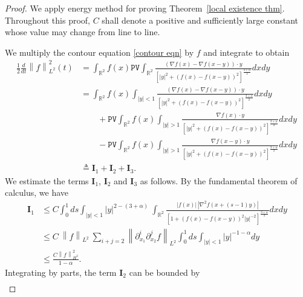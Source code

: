 \documentclass[reqno]{amsart}%
\theoremstyle{definition}
\theoremstyle{remark}
\numberwithin{equation}{section}
\newcommand{\0}{\mathbf{0}}
\newcommand{\1}{\mathbf{1}}
\newcommand{\PV}{\texttt{PV}}
\numberwithin{equation}{section}
\numberwithin{theorem}{section}
\numberwithin{figure}{section}
\begin{document}
\begin{proof}
We apply energy method for proving Theorem~\ref{local existence thm}. Throughout this proof, $C$ shall denote a positive and sufficiently large constant whose value may change from line to line.

We multiply the contour equation \eqref{contour eqn} by $f$ and integrate to obtain
\begin{equation*}
\begin{split}
\frac{1}{2} \frac{d}{dt} \left\|f\right\|_{L^2}^2(t)&=\int_{ \mathbb{R}^2 } f(x) \PV \int_{\mathbb{R}^2 } \frac{\left( \nabla f(x) - \nabla f(x - y)\right)\cdot y }{ \left[ |y|^2+(f(x)-f(x-y) )^2 \right]^{\frac{3 + \alpha}{2}} } dxdy\, \quad \quad \quad  \\
&= \int_{ \mathbb{R}^2 } f(x) \int_{ |y| < 1 } \frac{\left( \nabla f(x) - \nabla f(x - y)\right)\cdot y }{ \left[ |y|^2+(f(x)-f(x-y) )^2 \right]^{\frac{3 + \alpha}{2}} } dxdy\,   \\
&\qquad+ \PV \int_{ \mathbb{R}^2 } f(x) \int_{ |y| > 1 } \frac{ \nabla f(x)\cdot y }{ \left[ |y|^2+(f(x)-f(x-y) )^2 \right]^{\frac{3 + \alpha}{2}} } dxdy\,    \\
&\qquad- \PV \int_{ \mathbb{R}^2 } f(x) \int_{ |y| > 1 } \frac{ \nabla f(x-y)\cdot y }{ \left[ |y|^2+(f(x)-f(x-y) )^2 \right]^{\frac{3 + \alpha}{2}} } dxdy\, \\
&\triangleq \mathbf{I}_1 + \mathbf{I}_2 + \mathbf{I}_3.
\end{split}
\end{equation*}
We estimate the terms $\mathbf{I}_1$, $\mathbf{I}_2$ and $\mathbf{I}_3$ as follows. By the fundamental theorem of calculus, we have
\begin{equation*}
\begin{split}
\mathbf{I}_1&\leq C \int_{ 0 }^{1} ds  \int_{ |y| < 1 }  {|y|^{2 -(3 +\alpha)} }  \ \int_{ \mathbb{R}^2 } \frac{|f(x)| \, |\nabla^2 f(x+(s-1)y)|} {\left[ 1+\left(f(x)-f(x-y)\right)^2|y|^{-2}\right]^{\frac{3+\alpha}{2}}} dxdy\\
& \leq C \ \left\|f\right\|_{L^2} \ \sum_{i+j=2} \left\|\partial_{x_1}^i\partial_{x_2}^j f\right\|_{L^2}\int_{ 0 }^{1} ds  \int_{ |y| < 1 }  {|y|^{-1-\alpha} }dy   \\
&\leq \frac{ C\left\|f\right\|_{H^2}^2 }{ 1 - \alpha }. 
\end{split}
\end{equation*}
Integrating by parts, the term $\mathbf{I}_2$ can be bounded by
\begin{equation*}
\begin{split}

\end{split}
\end{equation*}
\end{proof}
\end{document}
